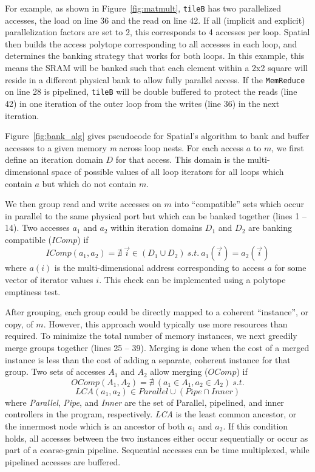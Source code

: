 For example, as shown in Figure~\ref{fig:matmult}, \texttt{\small{tileB}} has two parallelized accesses, the load on line 36 and the read on line 42. If all (implicit and explicit) parallelization factors are set to 2, this corresponds to 4 accesses per loop. Spatial then builds the access polytope corresponding to all accesses in each loop, and determines the banking strategy that works for both loops. In this example, this means the SRAM will be banked such that each element within a 2x2 square will reside
in a different physical bank to allow fully parallel access. If the \texttt{\small{MemReduce}} on line 28 is pipelined, \texttt{\small{tileB}} will be double buffered to protect the reads (line 42) in one iteration of the outer loop from the writes (line 36) in the next iteration.

Figure~\ref{fig:bank_alg} gives pseudocode for Spatial's algorithm to bank and buffer accesses to a given memory \emph{m} across loop nests. For each access $a$ to $m$, we first define an iteration domain $D$ for that access. This domain is the multi-dimensional space of possible values of all loop iterators for all loops which contain $a$ but which do not contain $m$.

We then group read and write accesses on $m$ into ``compatible'' sets which occur in parallel to the same physical port but which can be banked together (lines 1 -- 14).
Two accesses $a_1$ and $a_2$ within iteration domains $D_1$ and $D_2$
are banking compatible ($IComp$) if
\[ IComp(a_1,a_2) = \nexists~\vec{i} \in (D_1 \cup D_2) ~s.t.~a_1(\vec{i}) = a_2(\vec{i}) \]
where $a(i)$ is the multi-dimensional address corresponding to access $a$ for some vector of iterator values $i$.
This check can be implemented using a polytope emptiness test.

After grouping, each group could be directly mapped to a coherent ``instance'', or copy, of $m$.
However, this approach would typically use more resources than required. To minimize the total number of memory instances, we next greedily merge groups together (lines 25 -- 39). Merging is done when the cost of a merged instance is less than the cost of adding a separate, coherent instance for that group.
Two sets of accesses $A_1$ and $A_2$ allow merging ($OComp$) if
\[ OComp(A_1, A_2) = \nexists~ (a_1 \in A_1, a_2 \in A_2) ~s.t. \]
\[  LCA(a_1, a_2) \in Parallel \cup (Pipe \cap Inner) \]
where \emph{Parallel}, \emph{Pipe}, and \emph{Inner} are the set of Parallel, pipelined, and inner controllers in the program, respectively. \emph{LCA} is the least common ancestor, or the innermost node which is an ancestor of both $a_1$ and $a_2$.
If this condition holds, all accesses between the two instances either occur sequentially or occur as part of a coarse-grain pipeline. Sequential accesses can be time multiplexed, while pipelined accesses are buffered.

